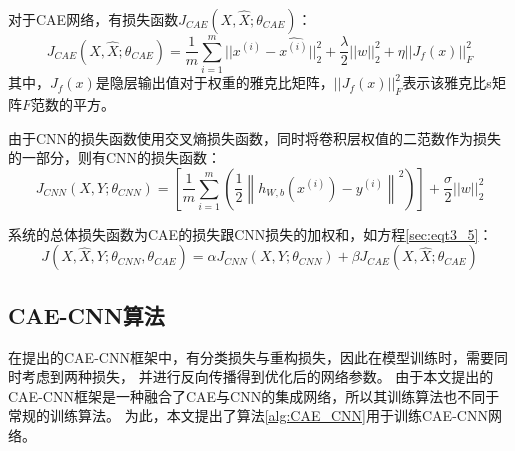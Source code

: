 对于CAE网络，有损失函数$J_{CAE}(X, \hat{X}; \theta_{CAE})$：
\begin{equation}\label{sec:eqt3_3}
	J_{CAE}(X, \hat{X}; \theta_{CAE}) = 
	\frac{1}{m}\sum_{i=1}^{m}||x^{(i)} - \hat{x^{(i)}}||_2^2  
	+ \frac{\lambda}{2}||w||_2^2 
	+ \eta||J_f(x)||_F^2
\end{equation}
其中，$J_f(x)$是隐层输出值对于权重的雅克比矩阵，$||J_f(x)||_F^2$表示该雅克比s矩阵$F$范数的平方。\par

由于CNN的损失函数使用交叉熵损失函数，同时将卷积层权值的二范数作为损失的一部分，则有CNN的损失函数：
\begin{equation}\label{sec:eqt3_4}
	J_{CNN}(X, Y; \theta_{CNN}) = 
	\left[ \frac{1}{m} \sum_{i=1}^m \left( \frac{1}{2} \left\| h_{W,b}(x^{(i)}) - y^{(i)} \right\|^2 \right) \right]
	+ \frac{\sigma}{2} ||w||_2^2
\end{equation}

系统的总体损失函数为CAE的损失跟CNN损失的加权和，如方程\eqref{sec:eqt3_5}：
\begin{equation}\label{sec:eqt3_5}
	J(X, \hat{X}, Y; \theta_{CNN}, \theta_{CAE}) = 
		\alpha J_{CNN}(X, Y; \theta_{CNN}) 
		+ \beta J_{CAE}(X, \hat{X}; \theta_{CAE})
\end{equation}

\subsection{CAE-CNN算法}
在提出的CAE-CNN框架中，有分类损失与重构损失，因此在模型训练时，需要同时考虑到两种损失，
并进行反向传播得到优化后的网络参数。
由于本文提出的CAE-CNN框架是一种融合了CAE与CNN的集成网络，所以其训练算法也不同于常规的训练算法。
为此，本文提出了算法\ref{alg:CAE_CNN}用于训练CAE-CNN网络。

